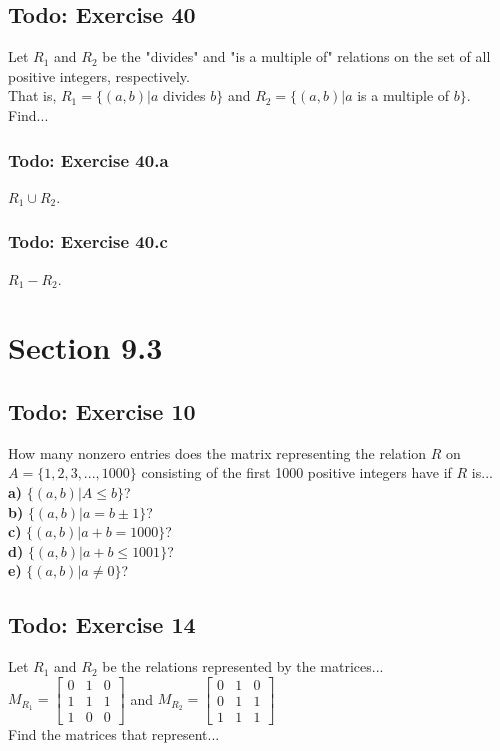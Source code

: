 \documentclass[12pt]{article}
\begin{document}
    \subsection{Todo: Exercise 40}
    Let $R_1$ and $R_2$ be the "divides" and "is a multiple of" relations on the set of all positive integers, respectively.\\
    That is, $R_1 = \{(a,b)|a $ divides $ b\}$ and $R_2=\{(a,b)|a$ is a multiple of $b\}$. Find...
    
    \subsubsection{Todo: Exercise 40.a}
    $R_1 \cup R_2$.
    
    \subsubsection{Todo: Exercise 40.c}
    $R_1 - R_2$.

    \section{Section 9.3}
    \subsection{Todo: Exercise 10}
    How many nonzero entries does the matrix representing the relation $R$ on $A=\{1,2,3,...,1000\}$ consisting of the first 1000 positive integers have if $R$ is...\\
    \textbf{a)} $\{(a,b) | A \leq b \}$?\\
    \textbf{b)} $\{(a,b) | a=b \pm 1 \}$?\\
    \textbf{c)} $\{(a,b) | a+b = 1000 \}$?\\
    \textbf{d)} $\{(a,b) | a+b \leq 1001 \}$?\\
    \textbf{e)} $\{(a,b) | a \neq 0 \}$?
    \subsection{Todo: Exercise 14}
    Let $R_1$ and $R_2$ be the relations represented by the matrices... \\
    $M_{R_1}=\begin{bmatrix}
        0 & 1 & 0\\
        1 & 1 & 1\\
        1 & 0 & 0
    \end{bmatrix}$ and $M_{R_2} = \begin{bmatrix}
        0 & 1 & 0 \\
        0 & 1 & 1 \\
        1 & 1 & 1
    \end{bmatrix}
    $\\
    Find the matrices that represent...
\end{document}
